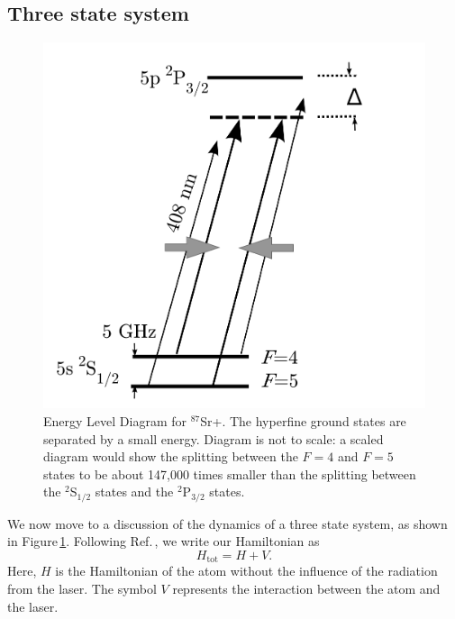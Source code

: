 \subsection{Three state system}
\label{threeStateSystemExplanation}
\begin{figure}
\centerline{
\includegraphics[totalheight=0.3\textheight]{E_level_from_proposal}
}
\caption[Energy level diagram for $^{87}$Sr+]{Energy Level Diagram for $^{87}$Sr+. The hyperfine ground states are separated by a small energy. Diagram is not to scale: a scaled diagram would show the splitting between the $F=4$ and $F=5$ states to be about 147,000 times smaller than the splitting between the $^2$S$_{1/2}$ states and the $^2$P$_{3/2}$ states.}
\label{energyLevelDiagramFigure}
\end{figure}
We now move to a discussion of the dynamics of a three state system, as shown in Figure\,\ref{energyLevelDiagramFigure}. Following Ref.\,\cite{Young1997363}, we write our Hamiltonian as
\begin{equation}
H_{\mathrm{tot}}=H+V.
\end{equation}
Here, $H$ is the Hamiltonian of the atom without the influence of the radiation from the laser. The symbol $V$ represents the interaction between the atom and the laser. 


